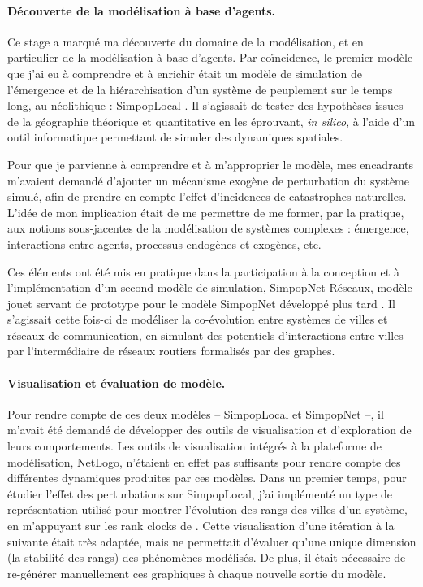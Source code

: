 \paragraph{Découverte de la modélisation à base d'agents.}

Ce stage a marqué ma découverte du domaine de la modélisation, et en particulier de la modélisation à base d'agents.
Par coïncidence, le premier modèle que j'ai eu à comprendre et à enrichir était un modèle de simulation de l'émergence et de la hiérarchisation d'un système de peuplement sur le temps long, au néolithique : SimpopLocal \autocite{schmitt_modelisation_2014,rey-coyrehourcq_plateforme_2015}.
Il s'agissait de tester des hypothèses issues de la géographie théorique et quantitative en les éprouvant, \textit{in silico}, à l'aide d'un outil informatique permettant de simuler des dynamiques spatiales.

Pour que je parvienne à comprendre et à m'approprier le modèle, mes encadrants m'avaient demandé d'ajouter un mécanisme exogène de perturbation du système simulé, afin de prendre en compte l'effet d'incidences de catastrophes naturelles. 
L'idée de mon implication était de me permettre de me former, par la pratique, aux notions sous-jacentes de la modélisation de systèmes complexes : émergence, interactions entre agents, processus endogènes et exogènes, etc.

Ces éléments ont été mis en pratique dans la participation à la conception et à l'implémentation d'un second modèle de simulation, \og SimpopNet-Réseaux\fg{}, \og modèle-jouet\fg{} servant de prototype pour le modèle SimpopNet développé plus tard \autocite{schmitt_modelisation_2014}.
Il s'agissait cette fois-ci de modéliser la co-évolution entre systèmes de villes et réseaux de communication, en simulant des potentiels d'interactions entre villes par l'intermédiaire de réseaux routiers formalisés par des graphes.

\paragraph{Visualisation et évaluation de modèle.}

Pour rendre compte de ces deux modèles -- SimpopLocal et SimpopNet --, il m'avait été demandé de développer des outils de visualisation et d'exploration de leurs comportements.
Les outils de visualisation intégrés à la plateforme de modélisation, NetLogo, n'étaient en effet pas suffisants pour rendre compte des différentes dynamiques produites par ces modèles.
Dans un premier temps, pour étudier l'effet des perturbations sur SimpopLocal, j'ai implémenté un type de représentation utilisé pour montrer l'évolution des rangs des villes d'un système, en m'appuyant sur les \og rank clocks\fg{} de \textcite{batty_rank_2006}.
Cette visualisation d'une itération à la suivante était très adaptée, mais ne permettait d'évaluer qu'une unique dimension (la stabilité des rangs) des phénomènes modélisés.
De plus, il était nécessaire de re-générer manuellement ces graphiques à chaque nouvelle sortie du modèle.

